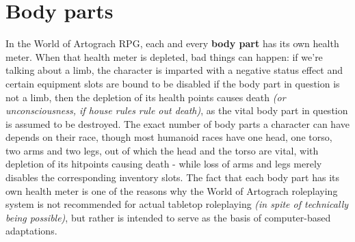 \documentclass[tikz,openany,11pt,a4paper]{book}
\begin{document}
\section{Body parts}
In the World of Artograch RPG, each and every \textbf{body part} has its own health meter. When that health meter is depleted, bad things can happen: if we're talking about a limb, the character is imparted with a negative status effect and certain equipment slots are bound to be disabled \textemdash if the body part in question is not a limb, then the depletion of its health points causes death \textit{(or unconsciousness, if house rules rule out death)}, as the vital body part in question is assumed to be destroyed.\newline
The exact number of body parts a character can have depends on their race, though most humanoid races have one head, one torso, two arms and two legs, out of which the head and the torso are vital, with depletion of its hitpoints causing death - while loss of arms and legs merely disables the corresponding inventory slots.\newline
The fact that each body part has its own health meter is one of the reasons why the World of Artograch roleplaying system is not recommended for actual tabletop roleplaying \textit{(in spite of technically being possible)}, but rather is intended to serve as the basis of computer-based adaptations.
\end{document}
